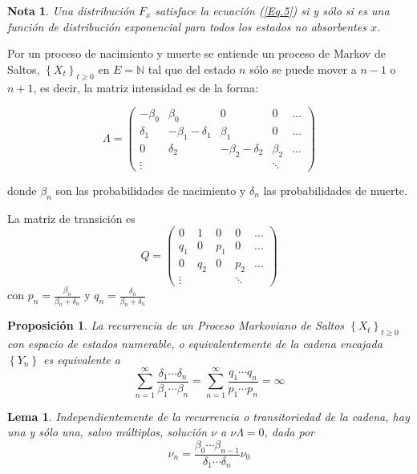 \documentclass{article}
\newtheorem{Note}{Nota}
\newtheorem{Prop}{Proposición}
\newtheorem{Lem}{Lema}
\newcommand{\nat}{\mathbb{N}}
\begin{document}
\begin{Note}
Una distribuci\'on $F_{x}$ satisface la ecuaci\'on (\ref{Eq.5}) si y s\'olo si es una funci\'on de distribuci\'on exponencial para todos los estados no absorbentes $x$.
\end{Note}

Por un proceso de nacimiento y muerte se entiende un proceso de Markov de Saltos, $\left\{X_{t}\right\}_{t\geq0}$ en $E=\nat$ tal que del estado $n$ s\'olo se puede mover a $n-1$ o $n+1$, es decir, la matriz intensidad es de la forma:

\begin{equation}
\Lambda=\left(\begin{array}{ccccc}
-\beta_{0}&\beta_{0} & 0 & 0 & \ldots\\
\delta_{1}&-\beta_{1}-\delta_{1} & \beta_{1}&0&\ldots\\
0&\delta_{2}&-\beta_{2}-\delta_{2} & \beta_{2}&\ldots\\
\vdots & & & \ddots &
\end{array}\right)
\end{equation}

donde $\beta_{n}$ son las probabilidades de nacimiento y
$\delta_{n}$ las probabilidades de muerte.

La matriz de transici\'on es
\begin{equation}
Q=\left(\begin{array}{ccccc}
0& 1 & 0 & 0 & \ldots\\
q_{1}&0 & p_{1}&0&\ldots\\
0&q_{2}&0& p_{2}&\ldots\\
\vdots & & & \ddots &
\end{array}\right)
\end{equation}
con $p_{n}=\frac{\beta_{n}}{\beta_{n}+\delta_{n}}$ y
$q_{n}=\frac{\delta_{n}}{\beta_{n}+\delta_{n}}$

\begin{Prop}
La recurrencia de un Proceso Markoviano de Saltos
$\left\{X_{t}\right\}_{t\geq0}$ con espacio de estados numerable, o equivalentemente de la cadena encajada $\left\{Y_{n}\right\}$ es equivalente a
\begin{equation}\label{Eq.2.1}
\sum_{n=1}^{\infty}\frac{\delta_{1}\cdots\delta_{n}}{\beta_{1}\cdots\beta_{n}}=\sum_{n=1}^{\infty}\frac{q_{1}\cdots
q_{n}}{p_{1}\cdots p_{n}}=\infty
\end{equation}
\end{Prop}

\begin{Lem}
Independientemente de la recurrencia o transitoriedad de la cadena, hay una y s\'olo una, salvo m\'ultiplos, soluci\'on $\nu$
a $\nu\Lambda=0$, dada por
\begin{equation}\label{Eq.2.2}
\nu_{n}=\frac{\beta_{0}\cdots\beta_{n-1}}{\delta_{1}\cdots\delta_{n}}\nu_{0}
\end{equation}
\end{Lem}
\end{document}
